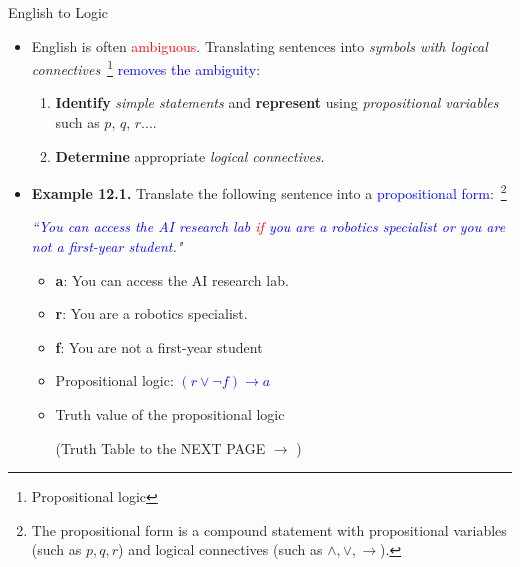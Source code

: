 \documentclass[aspectratio=169]{beamer}
\providecommand{\Blue}[1]{\textcolor{blue}{#1}}
\providecommand{\Red}[1]{\textcolor{red}{#1}}
\begin{document}
\begin{frame}[plain]{English to Logic}

\begin{itemize}
 \item  English  is often \Red{ambiguous}. 
   Translating sentences into \emph{symbols with logical connectives}~\footnote{Propositional logic}
   \Blue{removes the ambiguity}:
    \begin{enumerate}
       \item {\bf Identify} \emph{simple statements} and {\bf represent} using \emph{propositional  variables}  
       such  as  $p$, $q$, $r$....
       \item {\bf Determine} appropriate \emph{logical connectives}.
    \end{enumerate}\pause 
 \item {\bf Example 12.1.} Translate the following sentence into a \Blue{propositional form}:~\footnote{
   The propositional form is a compound statement with propositional variables (such as $p, q, r$) and
   logical connectives (such as $\wedge, \vee, \rightarrow$).}
   \smallskip
   
    \emph{
      ``\Blue{You can access the AI research lab \Red{if} you are a robotics specialist 
         or you are not a first-year student}."
         }\pause
         
   \begin{itemize}
     \item {\bf a}: You can access the AI research lab. %
     \item {\bf r}: You are a robotics specialist.
     \item {\bf f}: You are not a first-year student
     \item Propositional logic: \Blue{$(r\vee \neg f)\rightarrow a$}
     \item Truth value of the propositional logic \\
         \begin{center}
         (Truth Table to the NEXT PAGE $\longrightarrow$ )
          \end{center}
   \end{itemize}
 \end{itemize}
\end{frame}
\end{document}
